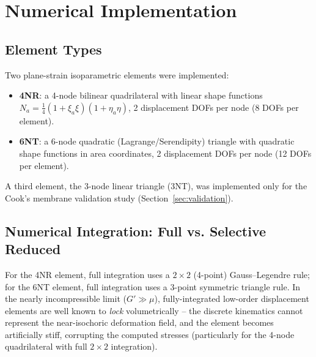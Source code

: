 \documentclass[11pt,a4paper]{article}
\begin{document}
\section{Numerical Implementation}

\subsection{Element Types}
Two plane-strain isoparametric elements were implemented:
\begin{itemize}
    \item \textbf{4NR}: a 4-node bilinear quadrilateral with linear shape functions
    $N_a = \tfrac14(1+\xi_a\xi)(1+\eta_a\eta)$, 2 displacement DOFs per node (8 DOFs per element).
    \item \textbf{6NT}: a 6-node quadratic (Lagrange/Serendipity) triangle with quadratic shape functions
    in area coordinates, 2 displacement DOFs per node (12 DOFs per element).
\end{itemize}
A third element, the 3-node linear triangle (3NT), was implemented only for the Cook's membrane validation
study (Section~\ref{sec:validation}).

\subsection{Numerical Integration: Full vs. Selective Reduced}
For the 4NR element, full integration uses a $2\times2$ (4-point) Gauss--Legendre rule; for the 6NT
element, full integration uses a 3-point symmetric triangle rule. In the nearly incompressible limit
($G' \gg \mu$), fully-integrated low-order displacement elements are well known to \emph{lock}
volumetrically -- the discrete kinematics cannot represent the near-isochoric deformation field, and the
element becomes artificially stiff, corrupting the computed stresses (particularly for the 4-node
quadrilateral with full $2\times2$ integration).
\end{document}
